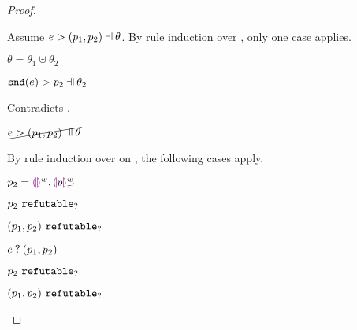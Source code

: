 \begin{proof}
\begin{byCases}
\begin{byCases}
\begin{byCases}
            Assume $\hpatmatch{e}{\hpair{p_1}{p_2}}{\theta}$. By rule induction over , only one case applies.
            \begin{byCases}
            \item[\text{(\ref{rule:MNotIntroPair})}]
                \begin{pfsteps*}
                \item $\theta=\theta_1\uplus\theta_2$ 
                \item $\hpatmatch{\hsnd{e}}{p_2}{\theta_2}$  
                \end{pfsteps*}
                Contradicts .
            \end{byCases}
            \begin{pfsteps*}
            \item $\cancel{\hpatmatch{e}{\hpair{p_1}{p_2}}{\theta}}$ 
            \end{pfsteps*}
            By rule induction over  on , the following cases apply.
            \begin{byCases}
            \item[\text{(\ref{rule:MMEHole}),(\ref{rule:MMHole})}]
                \begin{pfsteps*}
                \item $p_2=\textcolor{violet}{\llparenthesis}\textcolor{violet}{\rrparenthesis}^{w},\textcolor{violet}{\llparenthesis} p\textcolor{violet}{\rrparenthesis}^{w}_{\tau'}$ 
                \item $p_2 ~\mathtt{refutable}_?$  
                \item $(p_1 , p_2) ~\mathtt{refutable}_?$  
                \item $e \mathbin{?} (p_1 , p_2)$ 
                \end{pfsteps*}
            \item[\text{(\ref{rule:MMNotIntro})}]
                \begin{pfsteps*}
                \item $p_2 ~\mathtt{refutable}_?$  
                \item $(p_1 , p_2) ~\mathtt{refutable}_?$  

\end{pfsteps*}
\end{byCases}
\end{byCases}
\end{byCases}
\end{byCases}
\end{proof}

